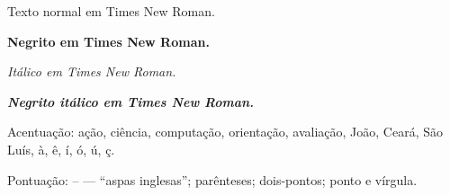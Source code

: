\documentclass[12pt]{article}
\begin{document}
Texto normal em Times New Roman.

\textbf{Negrito em Times New Roman.}

\textit{Itálico em Times New Roman.}

\textbf{\textit{Negrito itálico em Times New Roman.}}

Acentuação: ação, ciência, computação, orientação, avaliação, João, Ceará, São Luís, à, ê, í, ó, ú, ç.

Pontuação: -- --- ``aspas inglesas''; parênteses; dois-pontos; ponto e vírgula.
\end{document}

